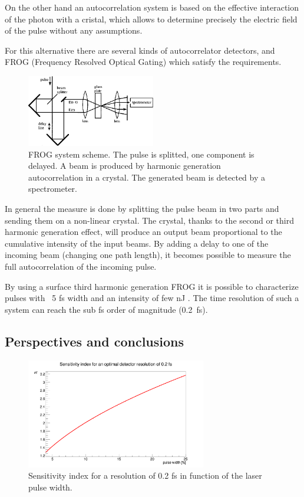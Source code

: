 \documentclass[9pt, a4, twoside]{article}
\begin{document}
On the other hand an autocorrelation system is based on the effective interaction of the photon with a cristal, which allows to determine precisely the electric field of the pulse without any assumptions.

For this alternative there are several kinds of autocorrelator detectors, and FROG (Frequency Resolved Optical Gating) which satisfy the requirements.

\begin{figure}[!]
\centering
\includegraphics[width=0.5\textwidth]{./img/thg_setup.png}
\caption{FROG system scheme. The pulse is splitted, one component is delayed. A beam is produced by harmonic generation autocorrelation in a crystal. The generated beam is detected by a spectrometer.}
\label{fig:sensiv}
\end{figure}

In general the measure is done by splitting the pulse beam in two parts and sending them on a non-linear crystal. The crystal, thanks to the second or third harmonic generation effect, will produce an output beam proportional to the cumulative intensity of the input beams. By adding a delay to one of the incoming beam (changing one path length), it becomes possible to measure the full autocorrelation of the incoming pulse.

By using a surface third harmonic generation FROG it is possible to characterize pulses with ~5 fs width and an intensity of few nJ \cite{frogref}. The time resolution of such a system can reach the sub fs order of magnitude (0.2~fs).

\subsection {Perspectives and conclusions}

\begin{figure}[!]
\centering
\includegraphics[width=0.70\textwidth]{./img/Pwdependency.png}
\caption{Sensitivity index for a resolution of 0.2 fs in function of the laser pulse width.}
\label{fig:sensivindex}
\end{figure}
\end{document}
